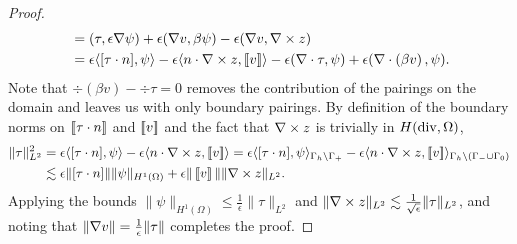 \begin{proof}
\begin{align*}
&=(\tau, \epsilon \grad \psi) + \epsilon(\grad v,\beta \psi) - \epsilon(\grad v,\curl z)  \\
&=\epsilon \langle [\tau \cdot n],\psi \rangle - \epsilon  \langle n\cdot \curl z, \jump{v}\rangle-\epsilon(\div \tau, \psi) + \epsilon(\div \left(\beta v\right), \psi).
\end{align*}
Note that $\div(\beta v) - \div \tau = 0$ removes the contribution of the pairings on the domain and leaves us with only boundary pairings. By definition of the boundary norms on $\jump{\tau\cdot n}$ and $\jump{v}$ and the fact that $\curl z$ is trivially in $H({\rm div}, \Omega)$,
\begin{align*}
\|\tau\|_{L^2}^2 &=\epsilon \langle [\tau \cdot n],\psi \rangle -
\epsilon \langle n\cdot \curl z, \jump{v}\rangle = \epsilon \langle [\tau
  \cdot n],\psi \rangle_{\Gh \setminus \Gamma_+} - \epsilon
\langle n\cdot \curl z,\jump{v}\rangle_{\Gh \setminus
  \left(\Gamma_-\cup \Gamma_0\right)}\\ &\lesssim \epsilon \|[\tau
  \cdot n]\| \|\psi\|_{H^1(\Omega)} + \epsilon \| \jump{v}\|\| \curl z
\|_{L^2}.
\end{align*}
Applying the bounds $\|\psi\|_{H^1(\Omega)}  \leq \frac{1}{\epsilon}\|\tau\|_{L^2}$ and 
$\|\curl z\|_{L^2} \lesssim \frac{1}{\sqrt{\epsilon}}\|\tau\|_{L^2}$, and noting that $\|\grad v\| = \frac{1}{\epsilon}\|\tau\|$ completes the proof.
\end{proof}
